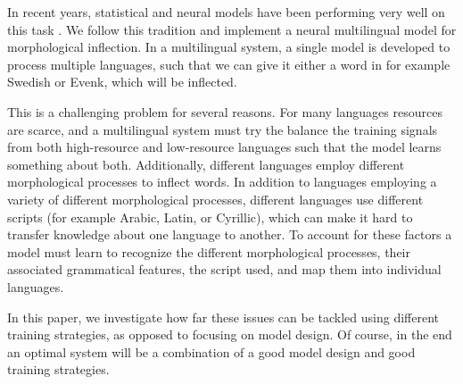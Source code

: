 \documentclass[11pt,a4paper]{article}
\begin{document}
In recent years, statistical and neural models have been performing
very well on this task \cite{DBLP:conf/eacl/SmitVGK14,
kann2016med}. We follow this tradition and implement a neural
multilingual model for morphological inflection. In a multilingual
system, a single model is developed to process multiple languages,
such that we can give it either a word in for example Swedish or
Evenk, which will be inflected.




This is a challenging problem for several reasons. For many languages
resources are scarce, and a multilingual system must try the balance
the training signals from both high-resource and low-resource
languages such that the model learns something about both.
Additionally, different languages employ different morphological
processes to inflect words. In addition to languages employing a
variety of different morphological processes, different languages use
different scripts (for example Arabic, Latin, or Cyrillic), which can
make it hard to transfer knowledge about one language to another.  To
account for these factors a model must learn to recognize the
different morphological processes, their associated grammatical
features, the script used, and map them into individual languages.

In this paper, we investigate how far these issues can be tackled
using different training strategies, as opposed to focusing on model
design. Of course, in the end an optimal system will be a
combination of a good model design and good training strategies.

\end{document}
